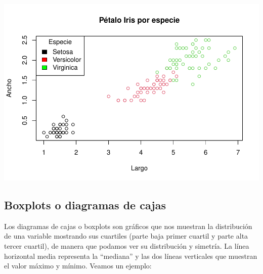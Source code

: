 \documentclass[
]{book}
\newenvironment{Shaded}{\begin{snugshade}}{\end{snugshade}}
\newcommand{\AttributeTok}[1]{\textcolor[rgb]{0.13,0.29,0.53}{#1}}
\newcommand{\FunctionTok}[1]{\textcolor[rgb]{0.13,0.29,0.53}{\textbf{#1}}}
\newcommand{\NormalTok}[1]{#1}
\newcommand{\SpecialCharTok}[1]{\textcolor[rgb]{0.81,0.36,0.00}{\textbf{#1}}}
\newcommand{\StringTok}[1]{\textcolor[rgb]{0.31,0.60,0.02}{#1}}
\begin{document}
\begin{Shaded}
\end{Shaded}

\includegraphics{R_Manual_files/figure-latex/unnamed-chunk-193-1.pdf}

\newpage

\subsection{Boxplots o diagramas de cajas}\label{boxplots-o-diagramas-de-cajas}

Los diagramas de cajas o boxplots son gráficos que nos muestran la distribución de una variable mostrando sus cuartiles (parte baja primer cuartil y parte alta tercer cuartil), de manera que podamos ver su distribución y simetría.
La línea horizontal media representa la ``mediana'' y las dos líneas verticales que muestran el valor máximo y mínimo.
Veamos un ejemplo:\\
\end{document}
